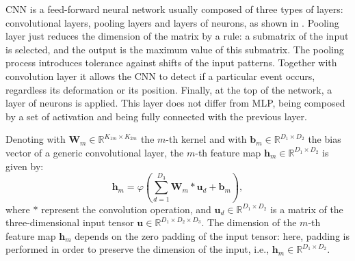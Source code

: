 CNN is a feed-forward neural network \cite{726791} usually composed of three types of layers: convolutional layers, pooling layers and layers of neurons, as shown in . Pooling layer just reduces the dimension of the matrix by a rule: a submatrix of the input is selected, and the output is the maximum value of this submatrix.
The pooling process introduces tolerance against shifts of the input patterns. Together with convolution layer it allows the CNN to detect if a particular event occurs, regardless its deformation or its position.
Finally, at the top of the network, a layer of neurons is applied. This layer does not differ from MLP, being composed by a set of activation and being fully connected with the previous layer. 

Denoting with $\mathbf{W}_{m} \in \mathbb{R}^{K_{1m}\times K_{2m}}$ the $m$-th kernel and with $\mathbf{b}_{m}  \in \mathbb{R}^{D_1\times D_2}$ the bias vector of a generic convolutional layer, the $m$-th feature map  $\mathbf{h}_{m} \in \mathbb{R}^{D_1\times D_2}$ is given by:
\begin{equation}
\label{eq:conv_op}
\mathbf{h}_{m}=\varphi	\left(\sum_{d=1}^{D_3} \mathbf{W}_{m} \ast \mathbf{u}_d + \mathbf{b}_{m} \right),
\end{equation}
where $\ast$ represent the convolution operation, and $\mathbf{u}_{d} \in \mathbb{R}^{D_1\times D_2} $ is a matrix of the three-dimensional input tensor $\mathbf{u} \in \mathbb{R}^{D_1\times D_2 \times D_3}$. The dimension of the $m$-th feature map $\mathbf{h}_{m}$ depends on the zero padding of the input tensor: here, padding is performed in order to preserve the dimension of the input, i.e., $\mathbf{h}_{m} \in \mathbb{R}^{D_1\times D_2}$. 

